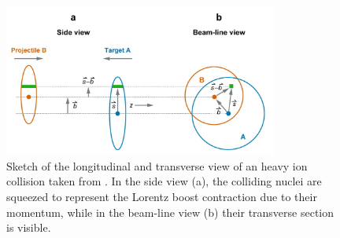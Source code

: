 \begin{figure}[!h]
    \centering
    \includegraphics[width=0.8\textwidth]{gfx/glauber}
	\caption{Sketch of the longitudinal and transverse view of an heavy ion collision taken from \cite{glauber}. In the side view (a), the colliding nuclei are squeezed to represent the Lorentz boost contraction due to their momentum, while in the beam-line view (b) their transverse section is visible.}
	\label{fig:glauber}
\end{figure}

